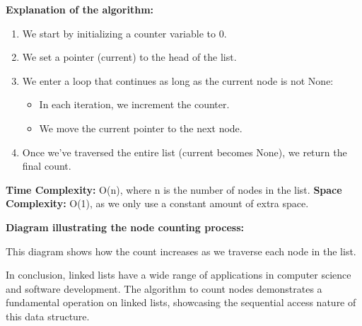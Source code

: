 \textbf{Explanation of the algorithm:}

\begin{enumerate}
\def\labelenumi{\arabic{enumi}.}
\tightlist
\item
  We start by initializing a counter variable to 0.
\item
  We set a pointer (current) to the head of the list.
\item
  We enter a loop that continues as long as the current node is not
  None:

  \begin{itemize}
  \tightlist
  \item
    In each iteration, we increment the counter.
  \item
    We move the current pointer to the next node.
  \end{itemize}
\item
  Once we've traversed the entire list (current becomes None), we return
  the final count.
\end{enumerate}

\textbf{Time Complexity:} O(n), where n is the number of nodes in the
list. \textbf{Space Complexity:} O(1), as we only use a constant amount
of extra space.

\textbf{Diagram illustrating the node counting process:}

\begin{Shaded}
\begin{Highlighting}[]
\end{Highlighting}
\end{Shaded}

This diagram shows how the count increases as we traverse each node in
the list.

In conclusion, linked lists have a wide range of applications in
computer science and software development. The algorithm to count nodes
demonstrates a fundamental operation on linked lists, showcasing the
sequential access nature of this data structure.


